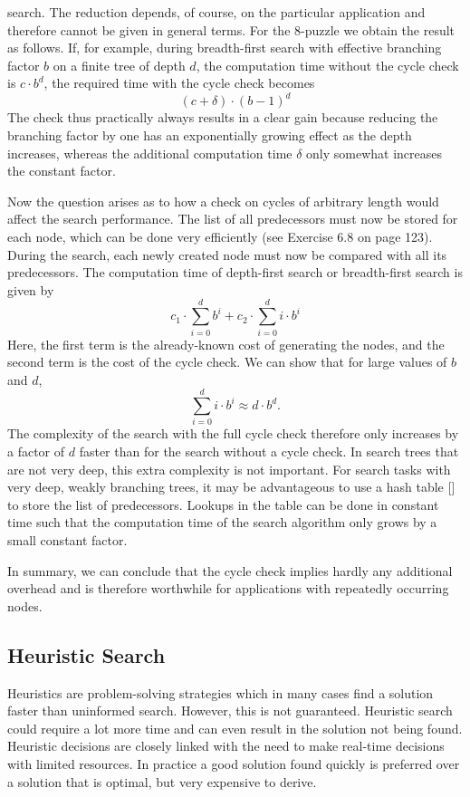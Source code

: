 \documentclass[10pt]{book}
\begin{document}
search. The reduction depends, of course, on the particular application and therefore cannot be given in general terms.
For the 8-puzzle we obtain the result as follows. If, for example, during breadth-first search with effective branching factor $b$ on a finite tree of depth $d$, the computation time without the cycle check is $c \cdot b^{d}$, the required time with the cycle check becomes
\[
(c+\delta) \cdot (b-1)^{d}
\]
The check thus practically always results in a clear gain because reducing the branching factor by one has an exponentially growing effect as the depth increases, whereas the additional computation time $\delta$ only somewhat increases the constant factor.

Now the question arises as to how a check on cycles of arbitrary length would affect the search performance. The list of all predecessors must now be stored for each node, which can be done very efficiently (see Exercise 6.8 on page 123). During the search, each newly created node must now be compared with all its predecessors. The computation time of depth-first search or breadth-first search is given by
\[
c_{1} \cdot \sum_{i=0}^{d} b^{i} + c_{2} \cdot \sum_{i=0}^{d} i \cdot b^{i}
\]
Here, the first term is the already-known cost of generating the nodes, and the second term is the cost of the cycle check. We can show that for large values of $b$ and $d$,
\[
\sum_{i=0}^{d} i \cdot b^{i} \approx d \cdot b^{d}.
\]
The complexity of the search with the full cycle check therefore only increases by a factor of $d$ faster than for the search without a cycle check. In search trees that are not very deep, this extra complexity is not important. For search tasks with very deep, weakly branching trees, it may be advantageous to use a hash table [\cite{cormen1990introduction}] to store the list of predecessors. Lookups in the table can be done in constant time such that the computation time of the search algorithm only grows by a small constant factor.

In summary, we can conclude that the cycle check implies hardly any additional overhead and is therefore worthwhile for applications with repeatedly occurring nodes.

\subsection{Heuristic Search}
Heuristics are problem-solving strategies which in many cases find a solution faster than uninformed search. However, this is not guaranteed. Heuristic search could require a lot more time and can even result in the solution not being found.
Heuristic decisions are closely linked with the need to make real-time decisions with limited resources. In practice a good solution found quickly is preferred over a solution that is optimal, but very expensive to derive.
\end{document}
